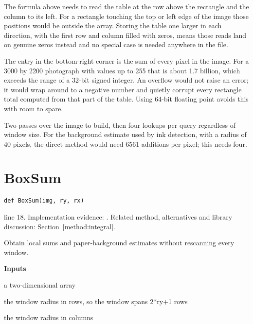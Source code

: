 The formula above needs to read the table at the row above the rectangle and the column to its left. For a rectangle touching the top or left edge of the image those positions would be outside the array. Storing the table one larger in each direction, with the first row and column filled with zeros, means those reads land on genuine zeros instead and no special case is needed anywhere in the file.


The entry in the bottom-right corner is the sum of every pixel in the image. For a 3000 by 2200 photograph with values up to 255 that is about 1.7 billion, which exceeds the range of a 32-bit signed integer. An overflow would not raise an error; it would wrap around to a negative number and quietly corrupt every rectangle total computed from that part of the table. Using 64-bit floating point avoids this with room to spare.


Two passes over the image to build, then four lookups per query regardless of window size. For the background estimate used by ink detection, with a radius of 40 pixels, the direct method would need 6561 additions per pixel; this needs four.



\section{BoxSum}\label{fn:segment:BoxSum}
\begin{lstlisting}[style=sig]
def BoxSum(img, ry, rx)
\end{lstlisting}
 line 18. Implementation evidence: \cite{code2026}. Related method, alternatives and library discussion: Section~\ref{method:integral}.


Obtain local sums and paper-background estimates without rescanning every window.




\noindent\textbf{Inputs}
\begin{description}[leftmargin=2.2em,style=nextline,font=\normalfont\ttfamily]\setlength\itemsep{1pt}
  \item[{img}] \normalfont a two-dimensional array
  \item[{ry}] \normalfont the window radius in rows, so the window spans 2*ry+1 rows
  \item[{rx}] \normalfont the window radius in columns
\end{description}

